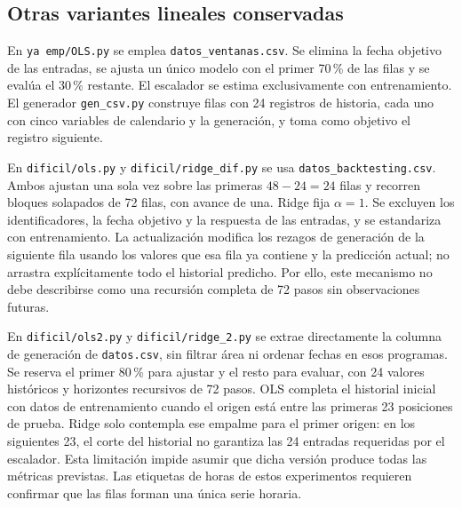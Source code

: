 \subsection{Otras variantes lineales conservadas}

En \texttt{ya emp/OLS.py} se emplea \texttt{datos\_ventanas.csv}. Se elimina la fecha objetivo de las entradas, se ajusta un único modelo con el primer 70\,\% de las filas y se evalúa el 30\,\% restante. El escalador se estima exclusivamente con entrenamiento. El generador \texttt{gen\_csv.py} construye filas con 24 registros de historia, cada uno con cinco variables de calendario y la generación, y toma como objetivo el registro siguiente.

En \texttt{dificil/ols.py} y \texttt{dificil/ridge\_dif.py} se usa \texttt{datos\_backtesting.csv}. Ambos ajustan una sola vez sobre las primeras $48-24=24$ filas y recorren bloques solapados de 72 filas, con avance de una. Ridge fija $\alpha=1$. Se excluyen los identificadores, la fecha objetivo y la respuesta de las entradas, y se estandariza con entrenamiento. La actualización modifica los rezagos de generación de la siguiente fila usando los valores que esa fila ya contiene y la predicción actual; no arrastra explícitamente todo el historial predicho. Por ello, este mecanismo no debe describirse como una recursión completa de 72 pasos sin observaciones futuras.

En \texttt{dificil/ols2.py} y \texttt{dificil/ridge\_2.py} se extrae directamente la columna de generación de \texttt{datos.csv}, sin filtrar área ni ordenar fechas en esos programas. Se reserva el primer 80\,\% para ajustar y el resto para evaluar, con 24 valores históricos y horizontes recursivos de 72 pasos. OLS completa el historial inicial con datos de entrenamiento cuando el origen está entre las primeras 23 posiciones de prueba. Ridge solo contempla ese empalme para el primer origen: en los siguientes 23, el corte del historial no garantiza las 24 entradas requeridas por el escalador. Esta limitación impide asumir que dicha versión produce todas las métricas previstas. Las etiquetas de horas de estos experimentos requieren confirmar que las filas forman una única serie horaria.
